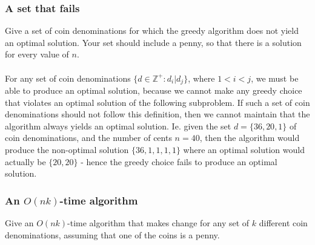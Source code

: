 \documentclass[11pt,english]{article}
\begin{document}
\subsubsection*{A set that fails}
\large{Give a set of coin denominations for which the greedy algorithm
does not yield an optimal solution. Your set should include a penny, so
that there is a solution for every value of $n$.}
\\\\
For any set of coin denominations
$\{d \in \mathbb{Z}^{+} : d_i | d_{j}\}$, where $1 < i < j$, we must be able to
produce an optimal solution, because we cannot make any greedy choice that
violates an optimal solution of the following subproblem. If such a set of
coin denominations should not follow this definition, then we cannot maintain
that the algorithm always yields an optimal solution. Ie. given the set
$d = \{36, 20, 1\}$ of coin denominations, and the number of cents $n = 40$,
then the algorithm would produce the non-optimal solution $\{36, 1, 1, 1, 1\}$
where an optimal solution would actually be $\{20, 20\}$ - hence the greedy
choice fails to produce an optimal solution.

\subsubsection*{An $O(nk)$-time algorithm}
\large{Give an $O(nk)$-time algorithm that makes change for any set of $k$
different coin denominations, assuming that one of the coins is a penny.}
\\







\end{document}
